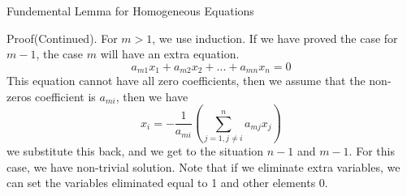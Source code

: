 \documentclass[hyperref={pdfpagelabels=true}]{beamer}
\newcommand{\<}{\langle}
\renewcommand{\>}{\rangle}
\begin{document}
\begin{frame}{Fundemental Lemma for Homogeneous Equations}
    \begin{block}{Proof(Continued).}
        For $m > 1$, we use induction. If we have proved the case for $m-1$, the case $m$ will have an extra equation.
        \[a_{m1}x_1+a_{m2}x_2+...+a_{mn}x_{n} = 0\]
        This equation cannot have all zero coefficients, then we assume that the non- zeros coefficient is $a_{mi}$, then we have
        \[x_{i} = -\frac{1}{a_{mi}}(\sum_{j = 1,j \neq i}^{n}a_{mj}x_{j})\]
        we substitute this back, and we get to the situation $n-1$ and $m-1$. For this case, we have non-trivial solution. Note that if we eliminate extra variables, we can set the variables eliminated equal to 1 and other elements 0.
    \end{block}  
\end{frame}
\end{document}
